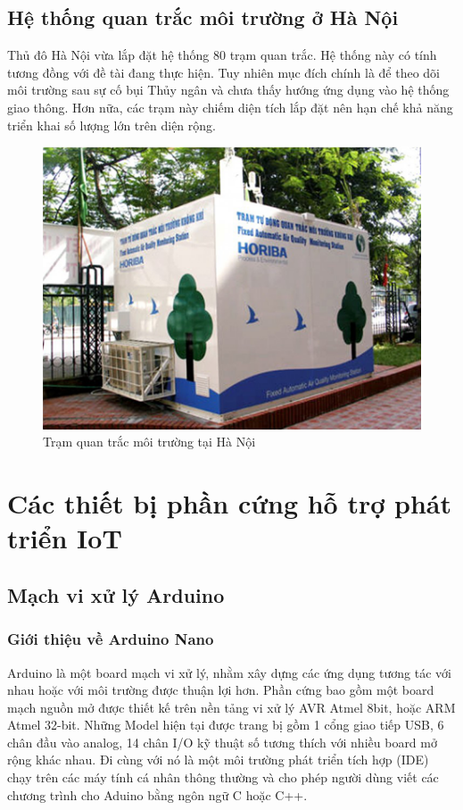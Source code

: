 \subsection{Hệ thống quan trắc môi trường ở Hà Nội}
Thủ đô Hà Nội vừa lắp đặt hệ thống 80 trạm quan trắc. Hệ thống này có tính tương đồng với đề tài đang thực hiện. Tuy nhiên mục đích chính là để theo dõi môi trường sau sự cố bụi Thủy ngân và chưa thấy hướng ứng dụng vào hệ thống giao thông. Hơn nữa, các trạm này chiếm diện tích lắp đặt nên hạn chế khả năng triển khai số lượng lớn trên diện rộng.
\begin{figure}[H] 
\centering    
\includegraphics[width=1.0\textwidth]{pic3}
\caption[Trạm quan trắc môi trường tại Hà Nội ]{Trạm quan trắc môi trường tại Hà Nội}
\label{fig:pic3}
\end{figure}

\section{Các thiết bị phần cứng hỗ trợ phát triển IoT}
\subsection{Mạch vi xử lý Arduino}
\subsubsection*{Giới thiệu về Arduino Nano}
Arduino là một board mạch vi xử lý, nhằm xây dựng các ứng dụng tương tác với nhau hoặc với môi trường được thuận lợi hơn. Phần cứng bao gồm một board mạch nguồn mở được thiết kế trên nền tảng vi xử lý AVR Atmel 8bit, hoặc ARM Atmel 32-bit. Những Model hiện tại được trang bị gồm 1 cổng giao tiếp USB, 6 chân đầu vào analog, 14 chân I/O kỹ thuật số tương thích với nhiều board mở rộng khác nhau. Đi cùng với nó là một môi trường phát triển tích hợp (IDE) chạy trên các máy tính cá nhân thông thường và cho phép người dùng viết các chương trình cho Aduino bằng ngôn ngữ C hoặc C++.

